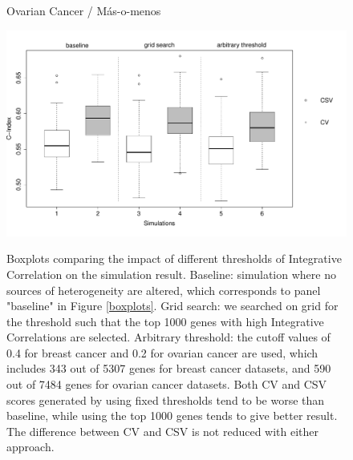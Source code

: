 \documentclass{article}
\begin{document}
  \begin{figure}[H]
        	\centerline{Ovarian Cancer / M\'{a}s-o-menos}
            \includegraphics[width=16cm]{ovarian_masomenos_filter_cutoff.pdf}
    \label{filter-cutoff}
    \caption{Boxplots comparing the impact of different thresholds of Integrative Correlation on the simulation result. Baseline: simulation where no sources of heterogeneity are altered, which corresponds to panel "baseline" in Figure \ref{boxplots}. Grid search: we searched on grid for the threshold such that the top 1000 genes with high Integrative Correlations are selected. Arbitrary threshold: the cutoff values of 0.4 for breast cancer and 0.2 for ovarian cancer are used, which includes 343 out of 5307 genes for breast cancer datasets, and 590 out of 7484 genes for ovarian cancer datasets. Both CV and CSV scores generated by using fixed thresholds tend to be worse than baseline, while using the top 1000 genes tends to give better result. The difference between CV and CSV is not reduced with either approach.}
  \end{figure}

\end{document}
